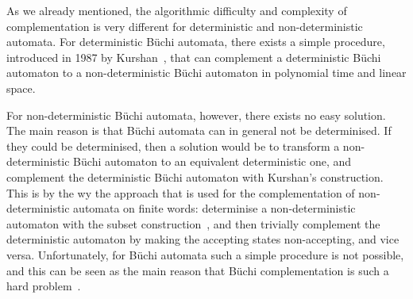 As we already mentioned, the algorithmic difficulty and complexity of complementation is very different for deterministic and non-deterministic automata. For deterministic Büchi automata, there exists a simple procedure, introduced in 1987 by Kurshan~\cite{Kurshan198759}, that can complement a deterministic Büchi automaton to a non-deterministic Büchi automaton in polynomial time and linear space.

For non-deterministic Büchi automata, however, there exists no easy solution. The main reason is that Büchi automata can in general not be determinised. If they could be determinised, then a solution would be to transform a non-deterministic Büchi automaton to an equivalent deterministic one, and complement the deterministic Büchi automaton with Kurshan's construction. This is by the wy the approach that is used for the complementation of non-deterministic automata on finite words: determinise a non-deterministic automaton with the subset construction~\cite{1959_rabin}, and then trivially complement the deterministic automaton by making the accepting states non-accepting, and vice versa. Unfortunately, for Büchi automata such a simple procedure is not possible, and this can be seen as the main reason that Büchi complementation is such a hard problem~\cite{niessner1997deterministic}.




